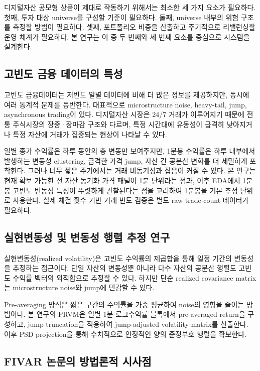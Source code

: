 \documentclass[12pt,a4paper]{article}
\begin{document}
디지털자산 공모형 상품이 제대로 작동하기 위해서는 최소한 세 가지 요소가 필요하다. 첫째, 투자 대상 universe를 구성할 기준이 필요하다. 둘째, universe 내부의 위험 구조를 측정할 방법이 필요하다. 셋째, 포트폴리오 비중을 산출하고 주기적으로 리밸런싱할 운영 체계가 필요하다. 본 연구는 이 중 두 번째와 세 번째 요소를 중심으로 시스템을 설계한다.


\subsection{고빈도 금융 데이터의 특성}

고빈도 금융데이터는 저빈도 일별 데이터에 비해 더 많은 정보를 제공하지만, 동시에 여러 통계적 문제를 동반한다. 대표적으로 microstructure noise, heavy-tail, jump, asynchronous trading이 있다. 디지털자산 시장은 24/7 거래가 이루어지기 때문에 전통 주식시장의 장중·장마감 구조와 다르며, 특정 시간대에 유동성이 급격히 낮아지거나 특정 자산에 거래가 집중되는 현상이 나타날 수 있다.

일별 종가 수익률은 하루 동안의 총 변동만 보여주지만, 1분봉 수익률은 하루 내부에서 발생하는 변동성 clustering, 급격한 가격 jump, 자산 간 공분산 변화를 더 세밀하게 포착한다. 그러나 너무 짧은 주기에서는 거래 비동기성과 잡음이 커질 수 있다. 본 연구는 현재 확보 가능한 전 자산 동기화 가격 패널이 1분 단위라는 점과, 이후 EDA에서 1분봉 고빈도 변동성 특성이 뚜렷하게 관찰된다는 점을 고려하여 1분봉을 기본 추정 단위로 사용한다. 실제 체결 횟수 기반 거래 빈도 검증은 별도 raw trade-count 데이터가 필요하다.

\subsection{실현변동성 및 변동성 행렬 추정 연구}

실현변동성(realized volatility)은 고빈도 수익률의 제곱합을 통해 일정 기간의 변동성을 추정하는 접근이다. 단일 자산의 변동성뿐 아니라 다수 자산의 공분산 행렬도 고빈도 수익률 벡터의 외적합으로 추정할 수 있다. 하지만 단순 realized covariance matrix는 microstructure noise와 jump에 민감할 수 있다.

Pre-averaging 방식은 짧은 구간의 수익률을 가중 평균하여 noise의 영향을 줄이는 방법이다. 본 연구의 PRVM은 일별 1분 로그수익률 블록에서 pre-averaged return을 구성하고, jump truncation을 적용하여 jump-adjusted volatility matrix를 산출한다. 이후 PSD projection을 통해 수치적으로 안정적인 양의 준정부호 행렬을 확보한다.

\subsection{FIVAR 논문의 방법론적 시사점}
\end{document}
